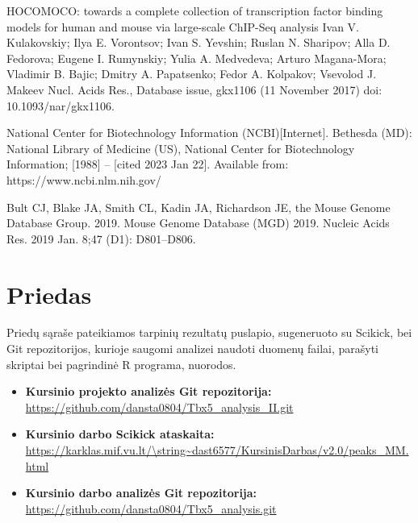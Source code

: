 \documentclass[12pt]{article}
\begin{document}
\begin{thebibliography}{99}
 HOCOMOCO: towards a complete collection of transcription
factor binding models for human and mouse via large-scale ChIP-Seq analysis
Ivan V. Kulakovskiy; Ilya E. Vorontsov; Ivan S. Yevshin; Ruslan N. Sharipov;
Alla D. Fedorova; Eugene I. Rumynskiy; Yulia A. Medvedeva; Arturo Magana-Mora;
Vladimir B. Bajic; Dmitry A. Papatsenko; Fedor A. Kolpakov; Vsevolod J. Makeev
Nucl. Acids Res., Database issue, gkx1106 (11 November 2017)
doi: 10.1093/nar/gkx1106.

 National Center for Biotechnology Information (NCBI)[Internet].
Bethesda (MD): National Library of Medicine (US), National Center for
Biotechnology Information; [1988] – [cited 2023 Jan 22]. Available from:
https://www.ncbi.nlm.nih.gov/

 Bult CJ, Blake JA, Smith CL, Kadin JA, Richardson JE, the
Mouse Genome Database Group. 2019. Mouse Genome Database (MGD) 2019.
Nucleic Acids Res. 2019 Jan. 8;47 (D1): D801–D806.
\end{thebibliography}

\newpage


\section{Priedas} \label{Priedas}

Priedų sąraše pateikiamos tarpinių rezultatų puslapio, sugeneruoto su Scikick,
bei Git repozitorijos, kurioje saugomi analizei naudoti duomenų failai,
parašyti skriptai bei pagrindinė R programa, nuorodos.

\begin{itemize}
    \item \textbf{Kursinio projekto analizės Git repozitorija:}\\
        \url{https://github.com/dansta0804/Tbx5\_analysis\_II.git}
    \item \textbf{Kursinio darbo Scikick ataskaita:}\\
        \url{https://karklas.mif.vu.lt/\string~dast6577/KursinisDarbas/v2.0/peaks\_MM.html}
    \item \textbf{Kursinio darbo analizės Git repozitorija:}\\
        \url{https://github.com/dansta0804/Tbx5\_analysis.git}
  \end{itemize}
\end{document}
